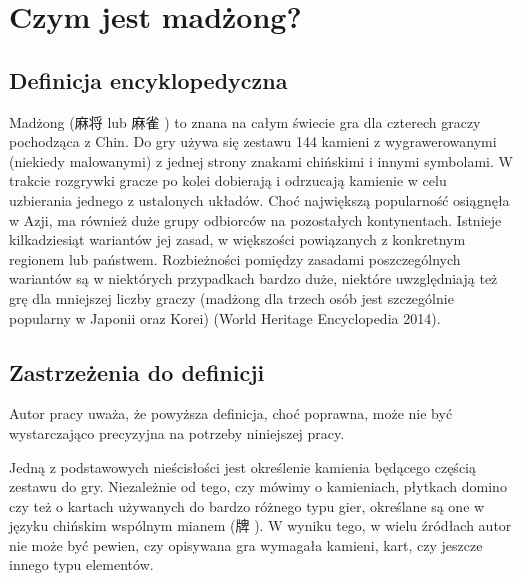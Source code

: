 \introduction
\section{Czym jest madżong?}
\subsection{Definicja encyklopedyczna}
Madżong (麻将  lub 麻雀 ) to znana na całym świecie
gra dla czterech graczy pochodząca z Chin. Do gry używa się zestawu 144 kamieni
z wygrawerowanymi (niekiedy malowanymi) z jednej strony znakami chińskimi i
innymi symbolami. W trakcie rozgrywki gracze po kolei dobierają i odrzucają
kamienie w celu uzbierania jednego z ustalonych układów. Choć największą
popularność osiągnęła w Azji, ma również duże grupy odbiorców na pozostałych
kontynentach.
Istnieje kilkadziesiąt wariantów jej zasad, w większości powiązanych z
konkretnym regionem lub państwem. Rozbieżności pomiędzy zasadami poszczególnych
wariantów są w niektórych przypadkach bardzo duże, niektóre uwzględniają też grę
dla mniejszej liczby graczy (madżong dla trzech osób jest szczególnie popularny
w Japonii oraz Korei) (World Heritage Encyclopedia 2014).
\subsection{Zastrzeżenia do definicji}
\label{zastrzezenia}
Autor pracy uważa, że powyższa definicja, choć poprawna, może nie być
wystarczająco precyzyjna na potrzeby niniejszej pracy.

Jedną z podstawowych nieścisłości jest określenie kamienia będącego częścią
zestawu do gry.
Niezależnie od tego, czy mówimy o kamieniach, płytkach domino czy też o kartach
używanych do bardzo różnego typu gier, określane są one w języku chińskim
wspólnym mianem  (牌 ). W wyniku tego, w wielu źródłach
autor nie może być pewien, czy opisywana gra wymagała kamieni, kart, czy jeszcze
innego typu elementów.

